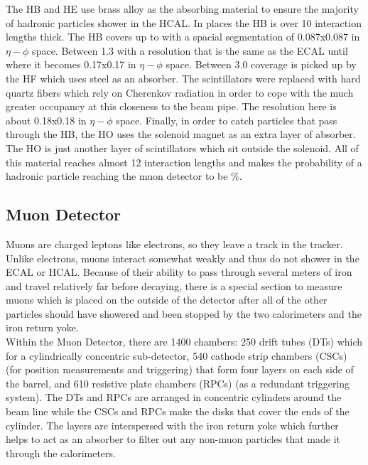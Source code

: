 The HB and HE use brass alloy as the absorbing material to ensure the majority of hadronic particles shower in the HCAL. In places the HB is over 10 interaction lengths thick. The HB covers up to \abseta {} with a spacial segmentation of 0.087x0.087 in $\eta - \phi$ space. Between 1.3 \lt \abseta {} with a resolution that is the same as the ECAL until \abseta {} where it becomes 0.17x0.17 in $\eta - \phi$ space. Between 3.0 \lt \abseta {} coverage is picked up by the HF which uses steel as an absorber. The scintillators were replaced with hard quartz fibers which rely on Cherenkov radiation in order to cope with the much greater occupancy at this closeness to the beam pipe. The resolution here is about 0.18x0.18 in $\eta - \phi$ space. Finally, in order to catch particles that pass through the HB, the HO uses the solenoid magnet as an extra layer of absorber. The HO is just another layer of scintillators which sit outside the solenoid. All of this material reaches almost 12 interaction lengths and makes the probability of a hadronic particle reaching the muon detector to be \%.
	
	\subsection{Muon Detector}
	\label{sec:muon_detector}
	Muons are charged leptons like electrons, so they leave a track in the tracker. Unlike electrons, muons interact somewhat weakly and thus do not shower in the ECAL or HCAL. Because of their ability to pass through several meters of iron and travel relatively far before decaying, there is a special section to measure muons which is placed on the outside of the detector after all of the other particles should have showered and been stopped by the two calorimeters and the iron return yoke. \\
	
	Within the Muon Detector, there are 1400 chambers: 250 drift tubes (DTs) which for a cylindrically concentric sub-detector, 540 cathode strip chambers (CSCs) (for position measurements and triggering) that form four layers on each side of the barrel, and 610 resistive plate chambers (RPCs) (as a redundant triggering system). The DTs and RPCs are arranged in concentric cylinders around the beam line while the CSCs and RPCs make the disks that cover the ends of the cylinder. The layers are interspersed with the iron return yoke which further helps to act as an absorber to filter out any non-muon particles that made it through the calorimeters.\\
	
